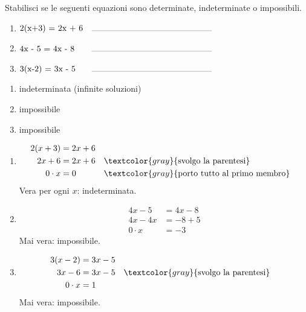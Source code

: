 
\begin{question}[ID=1.3, subtitle={Classificazione di equazioni}, difficulty=facile, tags={equazioni}]
Stabilisci se le seguenti equazioni sono determinate, indeterminate o impossibili.
\begin{enumerate}[leftmargin=3cm]
    \item $\makebox[3cm][l]{2(x+3) = 2x + 6}\rule{5cm}{0.2pt}$
    \item $\makebox[3cm][l]{4x - 5 = 4x - 8}\rule{5cm}{0.2pt}$
    \item $\makebox[3cm][l]{3(x-2) = 3x - 5}\rule{5cm}{0.2pt}$
\end{enumerate}
\begin{solution}
\begin{enumerate}
    \item indeterminata (infinite soluzioni)
    \item impossibile
    \item impossibile
\end{enumerate}
\end{solution}
\begin{explanation}
\begin{enumerate}
    \item \[\begin{aligned}
    2(x+3) &= 2x+6\\
    2x+6 &= 2x+6 && \textcolor{gray}{\text{svolgo la parentesi}}\\
    0\cdot x &= 0 && \textcolor{gray}{\text{porto tutto al primo membro}}
    \end{aligned}\]
    Vera per ogni $x$: indeterminata.
    \item \[\begin{aligned}
    4x-5 &= 4x-8\\
    4x-4x &= -8+5\\
    0\cdot x &= -3
    \end{aligned}\]
    Mai vera: impossibile.
    \item \[\begin{aligned}
    3(x-2) &= 3x-5\\
    3x-6 &= 3x-5 && \textcolor{gray}{\text{svolgo la parentesi}}\\
    0\cdot x &= 1
    \end{aligned}\]
    Mai vera: impossibile.
\end{enumerate}
\end{explanation}
\end{question}


